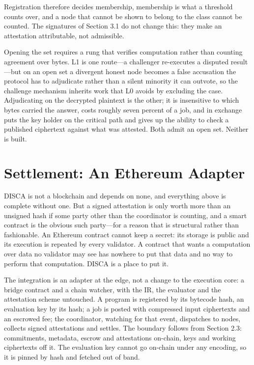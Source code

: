 \documentclass[12pt,a4paper]{article}
\begin{document}
Registration therefore decides membership, membership is what a threshold counts over, and a node that cannot be shown to belong to the class cannot be counted.
The signatures of Section 3.1 do not change this: they make an attestation attributable, not admissible.

Opening the set requires a rung that verifies computation rather than counting agreement over bytes.
L1 is one route---a challenger re-executes a disputed result---but on an open set a divergent honest node becomes a false accusation the protocol has to adjudicate rather than a silent minority it can outvote, so the challenge mechanism inherits work that L0 avoids by excluding the case.
Adjudicating on the decrypted plaintext is the other; it is insensitive to which bytes carried the answer, costs roughly seven percent of a job, and in exchange puts the key holder on the critical path and gives up the ability to check a published ciphertext against what was attested.
Both admit an open set. Neither is built.

\section{Settlement: An Ethereum Adapter}

DISCA is not a blockchain and depends on none, and everything above is complete without one.
But a signed attestation is only worth more than an unsigned hash if some party other than the coordinator is counting, and a smart contract is the obvious such party---for a reason that is structural rather than fashionable.
An Ethereum contract cannot keep a secret: its storage is public and its execution is repeated by every validator.
A contract that wants a computation over data no validator may see has nowhere to put that data and no way to perform that computation.
DISCA is a place to put it.

The integration is an adapter at the edge, not a change to the execution core: a bridge contract and a chain watcher, with the IR, the evaluator and the attestation scheme untouched.
A program is registered by its bytecode hash, an evaluation key by its hash; a job is posted with compressed input ciphertexts and an escrowed fee; the coordinator, watching for that event, dispatches to nodes, collects signed attestations and settles.
The boundary follows from Section 2.3: commitments, metadata, escrow and attestations on-chain, keys and working ciphertexts off it.
The evaluation key cannot go on-chain under any encoding, so it is pinned by hash and fetched out of band.
\end{document}
